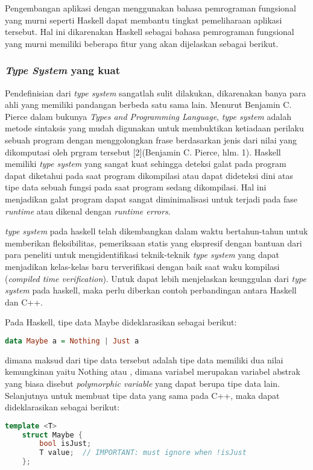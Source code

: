 \documentclass[pi.tex]{subfile}
\begin{document}
Pengembangan aplikasi dengan menggunakan bahasa pemrograman fungsional yang murni seperti Haskell dapat membantu tingkat pemeliharaan aplikasi tersebut. Hal ini dikarenakan Haskell sebagai bahasa pemrograman fungsional yang murni memiliki beberapa fitur yang akan dijelaskan sebagai berikut.

 \subsubsection{\emph{Type System} yang kuat}
  
  Pendefinisian dari \emph{type system} sangatlah sulit dilakukan, dikarenakan banya para ahli yang memiliki pandangan berbeda satu sama lain. Menurut Benjamin C. Pierce dalam bukunya \emph{Types and Programming Language}, \emph{type system} adalah metode sintaksis yang mudah digunakan untuk membuktikan ketiadaan perilaku sebuah program dengan menggolongkan frase berdasarkan jenis dari nilai yang dikomputasi oleh prgram tersebut [2](Benjamin C. Pierce, hlm. 1). Haskell memiliki \emph{type system} yang sangat kuat sehingga deteksi galat pada program dapat diketahui pada saat program dikompilasi atau dapat dideteksi dini atas tipe data sebuah fungsi pada saat program sedang dikompilasi. Hal ini menjadikan galat program dapat sangat diminimalisasi untuk terjadi pada fase \emph{runtime} atau dikenal dengan \emph{runtime errors}.

  \emph{type system} pada haskell telah dikembangkan dalam waktu bertahun-tahun untuk memberikan fleksibilitas, pemeriksaan statis yang ekspresif dengan bantuan dari para peneliti untuk mengidentifikasi teknik-teknik \emph{type system} yang dapat menjadikan kelas-kelas baru terverifikasi dengan baik saat waku kompilasi (\emph{compiled time verification}). Untuk dapat lebih menjelaskan keunggulan dari \emph{type system} pada haskell, maka perlu diberkan contoh perbandingan antara Haskell dan C++.

  Pada Haskell, tipe data Maybe dideklarasikan sebagai berikut:\\
  \begin{lstlisting}[language=Haskell]
    data Maybe a = Nothing | Just a
  \end{lstlisting}
  dimana maksud dari tipe data tersebut adalah tipe data  memiliki dua nilai kemungkinan yaitu Nothing atau , dimana variabel  merupakan variabel abstrak yang biasa disebut \emph{polymorphic variable} yang dapat berupa tipe data lain. Selanjutnya untuk membuat tipe data yang sama pada C++, maka dapat dideklarasikan sebagai berikut:\\
  \begin{lstlisting}[language=C++]
    template <T>
    struct Maybe {
        bool isJust;
        T value;  // IMPORTANT: must ignore when !isJust
    };
  \end{lstlisting}
\end{document}
